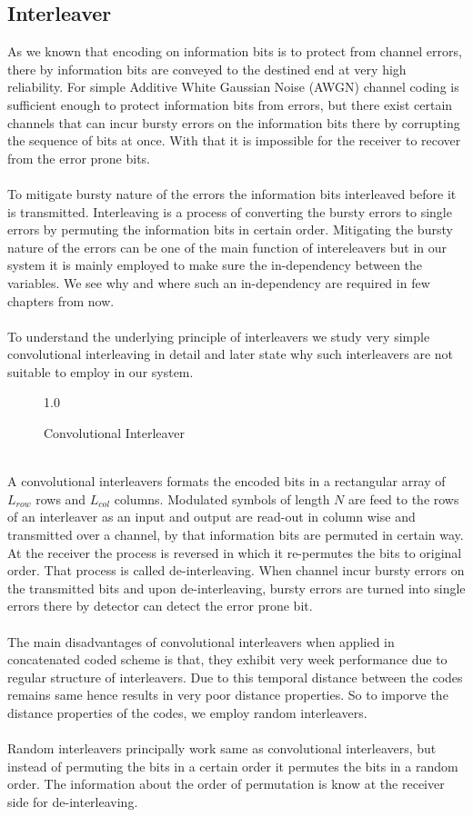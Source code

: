 \subsection{Interleaver}
As we known that encoding on information bits is to protect from channel errors, there by information bits are conveyed to the destined end at very high reliability. For simple Additive White Gaussian Noise (AWGN) channel coding is sufficient enough to protect information bits from errors, but there exist certain channels that can incur bursty errors on the information bits there by corrupting the sequence of bits at once. With that it is impossible for the receiver to recover from the error prone bits. \\ \\
To mitigate bursty nature of the errors the information bits interleaved before it is transmitted. Interleaving is a process of converting the bursty errors to single errors by permuting the information bits in certain order. Mitigating the bursty nature of the errors can be one of the main function of intereleavers but in our system it is mainly employed to make sure the in-dependency between the variables. We see why and where such an in-dependency are required in few chapters from now. \\ \\
To understand the underlying principle of interleavers we study very simple convolutional interleaving in detail and later state why such interleavers are not suitable to employ in our system.
\begin{figure}[htb]
\centerline{  {1.0} }
\caption{Convolutional Interleaver}
\end{figure}\\
A convolutional interleavers formats the encoded bits in a rectangular array of $L_{row}$ rows and $L_{col}$ columns. Modulated symbols of length $N$ are feed to the rows of an interleaver as an input and output are read-out in column wise and transmitted over a channel, by that information bits are permuted in certain way. At the receiver the process is reversed in which it re-permutes the bits to original order. That process is called de-interleaving. When channel incur bursty errors on the transmitted bits and upon de-interleaving, bursty errors are turned into single errors there by detector can detect the error prone bit. \\ \\
The main disadvantages of convolutional interleavers when applied in concatenated coded scheme is that, they exhibit very week performance due to regular structure of interleavers. Due to this temporal distance between the codes remains same hence results in very poor distance properties. So to imporve the distance properties of the codes, we employ random interleavers. \\ \\
Random interleavers principally work same as convolutional interleavers, but instead of permuting the bits in a certain order it permutes the bits in a random order. The information about the order of permutation is know at the receiver side for de-interleaving.
